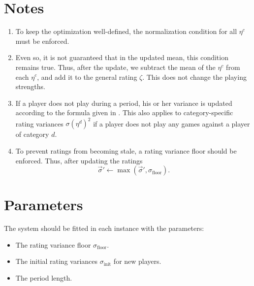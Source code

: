 \documentclass[a4paper, twoside, notitlepage, 11pt]{article}
\begin{document}
\section{Notes}
\begin{enumerate}
\item To keep the optimization well-defined, the normalization condition for
    all $\eta^c$ must be enforced.
\item Even so, it is not guaranteed that in the updated mean, this condition
    remains true. Thus, after the update, we subtract the mean of the $\eta^c$
    from each $\eta^c$, and add it to the general rating $\zeta$. This does not
    change the playing strengths.
\item If a player does not play during a period, his or her variance is updated
    according to the formula given in \cite{Glickman99}. This also applies to
    category-specific rating variances $\sigma(\eta^d)^2$ if a player does not
    play any games against a player of category $d$.
\item To prevent ratings from becoming stale, a rating variance floor should be
    enforced. Thus, after updating the ratings
    $$
        \vec{\sigma}' \leftarrow \max(\vec{\sigma}', \sigma_\mathrm{floor}).
    $$
\end{enumerate}

\section{Parameters}
The system should be fitted in each instance with the parameters:
\begin{itemize}
    \item The rating variance floor $\sigma_\mathrm{floor}$.
    \item The initial rating variances $\sigma_\mathrm{init}$ for new players.
    \item The period length.
\end{itemize}



\end{document}

